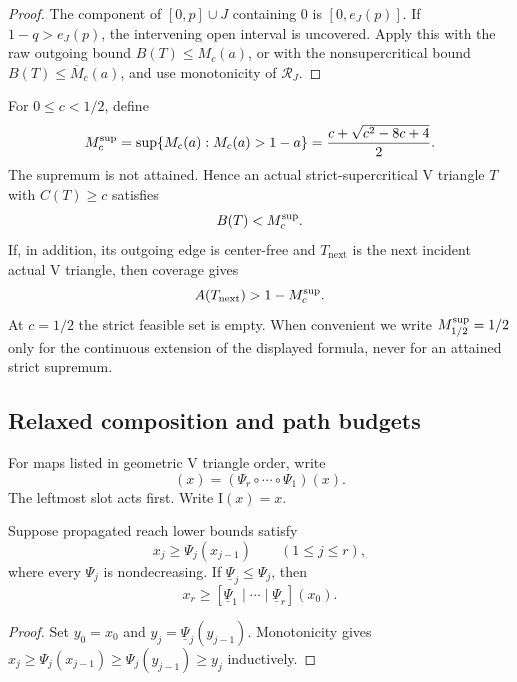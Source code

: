 \begin{proof}
The component of $[0,p]\cup J$ containing $0$ is $[0,e_J(p)]$.  If
$1-q>e_J(p)$, the intervening open interval is uncovered.  Apply this with
the raw outgoing bound $B(T)\le M_c(a)$, or with the nonsupercritical bound
$B(T)\le\overline M_c(a)$, and use monotonicity of $\mathcal R_J$.
\end{proof}

For $0\le c<1/2$, define
\begin{equation}
 M_c^{\rm sup}
 =\sup\{M_c(a):M_c(a)>1-a\}
 =\frac{c+\sqrt{c^2-8c+4}}2.
 \label{eq:reader-free-supercritical-envelope}
\end{equation}
The supremum is not attained. Hence an actual strict-supercritical V triangle
$T$ with $C(T)\ge c$ satisfies
\begin{equation}
 B(T)<M_c^{\rm sup}.
 \label{eq:reader-free-outgoing-envelope}
\end{equation}
If, in addition, its outgoing edge is center-free and $T_{\mathrm{next}}$ is
the next incident actual V triangle, then coverage gives
\begin{equation}
 A(T_{\mathrm{next}})>1-M_c^{\rm sup}.
 \label{eq:reader-free-raw-envelope}
\end{equation}
At $c=1/2$ the strict feasible set is empty. When convenient we write
$M_{1/2}^{\rm sup}=1/2$ only for the continuous extension of the displayed
formula, never for an attained strict supremum.

\subsection{Relaxed composition and path budgets}

For maps listed in geometric V triangle order, write
\begin{equation}
 [\Psi_1\mid\cdots\mid\Psi_r](x)
 =(\Psi_r\circ\cdots\circ\Psi_1)(x).
 \label{eq:reader-chain-notation}
\end{equation}
The leftmost slot acts first.  Write $\mathrm I(x)=x$.

\begin{lemma}
\label{lem:reader-relaxed-composition}
Suppose propagated reach lower bounds satisfy
\[
 x_j\ge\Psi_j(x_{j-1})
 \qquad(1\le j\le r),
\]
where every $\Psi_j$ is nondecreasing.  If
$\underline\Psi_j\le\Psi_j$, then
\[
 x_r\ge[\underline\Psi_1\mid\cdots\mid\underline\Psi_r](x_0).
\]
\end{lemma}

\begin{proof}
Set $y_0=x_0$ and $y_j=\underline\Psi_j(y_{j-1})$.  Monotonicity gives
$x_j\ge\Psi_j(x_{j-1})\ge\Psi_j(y_{j-1})\ge y_j$ inductively.
\end{proof}

